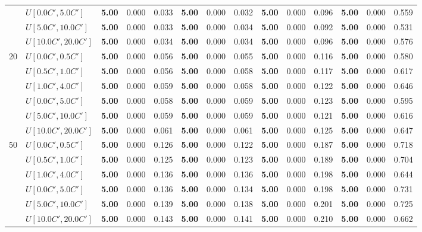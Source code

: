 \begin{table}[h]
{\begin{tabular}{|l|l||l|l|l||l|l|l||l|l|l||l|l|l|}
       & $U[0.0C',5.0C']$ & \textbf{5.00} & 0.000 & 0.033 & \textbf{5.00} & 0.000 & 0.032 & \textbf{5.00} & 0.000 & 0.096 & \textbf{5.00} & 0.000 & 0.559 \\
       & $U[5.0C',10.0C']$ & \textbf{5.00} & 0.000 & 0.033 & \textbf{5.00} & 0.000 & 0.034 & \textbf{5.00} & 0.000 & 0.092 & \textbf{5.00} & 0.000 & 0.531 \\
       & $U[10.0C',20.0C']$ & \textbf{5.00} & 0.000 & 0.034 & \textbf{5.00} & 0.000 & 0.034 & \textbf{5.00} & 0.000 & 0.096 & \textbf{5.00} & 0.000 & 0.576 \\
      \hline\hline
      \multirow{6}{*}{20} & $U[0.0C',0.5C']$ & \textbf{5.00} & 0.000 & 0.056 & \textbf{5.00} & 0.000 & 0.055 & \textbf{5.00} & 0.000 & 0.116 & \textbf{5.00} & 0.000 & 0.580 \\
       & $U[0.5C',1.0C']$ & \textbf{5.00} & 0.000 & 0.056 & \textbf{5.00} & 0.000 & 0.058 & \textbf{5.00} & 0.000 & 0.117 & \textbf{5.00} & 0.000 & 0.617 \\
       & $U[1.0C',4.0C']$ & \textbf{5.00} & 0.000 & 0.059 & \textbf{5.00} & 0.000 & 0.058 & \textbf{5.00} & 0.000 & 0.122 & \textbf{5.00} & 0.000 & 0.646 \\
       & $U[0.0C',5.0C']$ & \textbf{5.00} & 0.000 & 0.058 & \textbf{5.00} & 0.000 & 0.059 & \textbf{5.00} & 0.000 & 0.123 & \textbf{5.00} & 0.000 & 0.595 \\
       & $U[5.0C',10.0C']$ & \textbf{5.00} & 0.000 & 0.059 & \textbf{5.00} & 0.000 & 0.059 & \textbf{5.00} & 0.000 & 0.121 & \textbf{5.00} & 0.000 & 0.616 \\
       & $U[10.0C',20.0C']$ & \textbf{5.00} & 0.000 & 0.061 & \textbf{5.00} & 0.000 & 0.061 & \textbf{5.00} & 0.000 & 0.125 & \textbf{5.00} & 0.000 & 0.647 \\
      \hline\hline
      \multirow{6}{*}{50} & $U[0.0C',0.5C']$ & \textbf{5.00} & 0.000 & 0.126 & \textbf{5.00} & 0.000 & 0.122 & \textbf{5.00} & 0.000 & 0.187 & \textbf{5.00} & 0.000 & 0.718 \\
       & $U[0.5C',1.0C']$ & \textbf{5.00} & 0.000 & 0.125 & \textbf{5.00} & 0.000 & 0.123 & \textbf{5.00} & 0.000 & 0.189 & \textbf{5.00} & 0.000 & 0.704 \\
       & $U[1.0C',4.0C']$ & \textbf{5.00} & 0.000 & 0.136 & \textbf{5.00} & 0.000 & 0.136 & \textbf{5.00} & 0.000 & 0.198 & \textbf{5.00} & 0.000 & 0.644 \\
       & $U[0.0C',5.0C']$ & \textbf{5.00} & 0.000 & 0.136 & \textbf{5.00} & 0.000 & 0.134 & \textbf{5.00} & 0.000 & 0.198 & \textbf{5.00} & 0.000 & 0.731 \\
       & $U[5.0C',10.0C']$ & \textbf{5.00} & 0.000 & 0.139 & \textbf{5.00} & 0.000 & 0.138 & \textbf{5.00} & 0.000 & 0.201 & \textbf{5.00} & 0.000 & 0.725 \\
       & $U[10.0C',20.0C']$ & \textbf{5.00} & 0.000 & 0.143 & \textbf{5.00} & 0.000 & 0.141 & \textbf{5.00} & 0.000 & 0.210 & \textbf{5.00} & 0.000 & 0.662 \\
      \hline
      \end{tabular}
      }
      \label{tab:pcpn90p3}\end{table}
      

